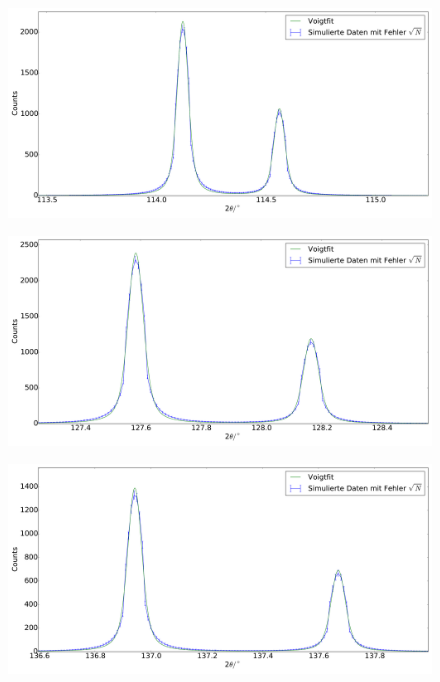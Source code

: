 \begin{figure}[H]
\begin{minipage}{.5\textwidth}
  \centering
  \includegraphics[scale=0.15]{Simulation_Siliciumpulver_9}
  \label{fig:pul_sim_sil_9}
\end{minipage}
\hspace{0.5cm}
\begin{minipage}{.5\textwidth}
  \centering
  \includegraphics[scale=0.15]{Simulation_Siliciumpulver_10}
  \label{fig:pul_sim_sil_10}
\end{minipage}
\end{figure}
\begin{figure}[H]
\begin{minipage}{.5\textwidth}
  \centering
  \includegraphics[scale=0.15]{Simulation_Siliciumpulver_11}
  \label{fig:pul_sim_sil_11}
\end{minipage}
\end{figure}

